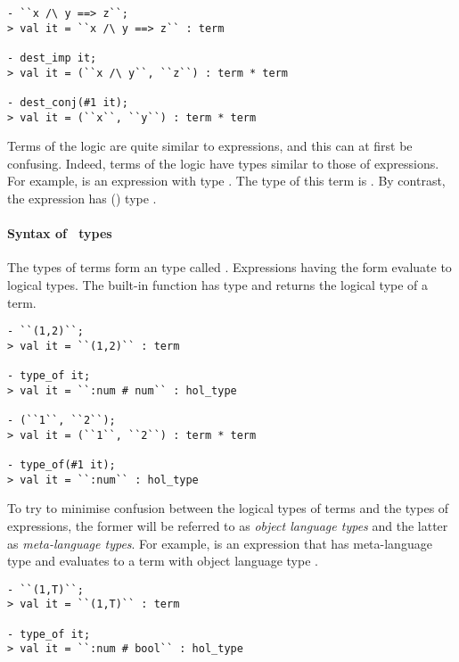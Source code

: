 \setcounter{sessioncount}{0}
\begin{session}
\begin{verbatim}
- ``x /\ y ==> z``;
> val it = ``x /\ y ==> z`` : term

- dest_imp it;
> val it = (``x /\ y``, ``z``) : term * term

- dest_conj(#1 it);
> val it = (``x``, ``y``) : term * term
\end{verbatim}
\end{session}

Terms of the \HOL{} logic are quite similar to \ML{} expressions, and this can at first be confusing.
Indeed, terms of the logic have types similar to those of \ML{} expressions.
For example,  is an \ML{} expression with \ML{} type .
The \HOL{} type of this term is .
By contrast, the \ML{} expression  has (\ML{}) type .

\paragraph{Syntax of \HOL\ types}

The types of \HOL{} terms form an \ML{} type called .
Expressions having the form  evaluate to logical types.
The built-in function  has \ML{} type  and returns the logical type of a term.

\begin{session}
\begin{verbatim}
- ``(1,2)``;
> val it = ``(1,2)`` : term

- type_of it;
> val it = ``:num # num`` : hol_type

- (``1``, ``2``);
> val it = (``1``, ``2``) : term * term

- type_of(#1 it);
> val it = ``:num`` : hol_type
\end{verbatim}
\end{session}

To try to minimise confusion between the logical types of \HOL{} terms and the \ML{} types of \ML{} expressions, the former will be referred to as \emph{object language types} and the latter as \emph{meta-language types}.
For example,  is an \ML{} expression that has meta-language type  and evaluates to a term with object language type .
%
\begin{session}
\begin{verbatim}
- ``(1,T)``;
> val it = ``(1,T)`` : term

- type_of it;
> val it = ``:num # bool`` : hol_type
\end{verbatim}
\end{session}
%
